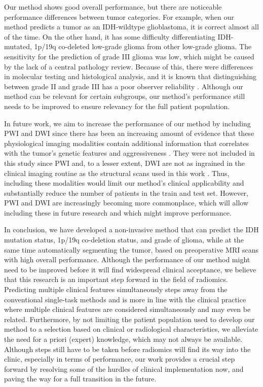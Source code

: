 Our method shows good overall performance, but there are noticeable performance differences between \gls{tumor} categories.
For example, when our method predicts a \gls{tumor} as an \gls{IDH}-wildtype glioblastoma, it is correct almost all of the time.
On the other hand, it has some difficulty differentiating \gls{IDH}-mutated, 1p/19q co-deleted low-grade glioma from other low-grade glioma.
The sensitivity for the prediction of grade III glioma was low, which might be caused by the lack of a central pathology review.
Because of this, there were differences in molecular testing and histological analysis, and it is known that distinguishing between grade II and grade III has a poor observer reliability \autocite{vandenbent2010interobserver}.
Although our method can be relevant for certain subgroups, our method's performance still needs to be improved to ensure relevancy for the full patient population.

In future work, we aim to increase the performance of our method by including \gls{PWI} and \gls{DWI} since there has been an increasing amount of evidence that these physiological imaging modalities contain additional information that correlates with the \gls{tumor}'s genetic features and aggressiveness \autocite{park2020radiomicspwi, kim2020diffusion}.
They were not included in this study since \gls{PWI} and, to a lesser extent, \gls{DWI} are not as ingrained in the clinical imaging routine as the structural scans used in this work \autocite{thust2018gliomaimaging, fresychlag2018imaging}.
Thus, including these modalities would limit our method's clinical applicability and substantially reduce the number of patients in the train and test set.
However, \gls{PWI} and \gls{DWI} are increasingly becoming more commonplace, which will allow including these in future research and which might improve performance.

In conclusion, we have developed a non-invasive method that can predict the \gls{IDH} mutation status, 1p/19q co-deletion status, and grade of glioma, while at the same time automatically segmenting the \gls{tumor}, based on preoperative \gls{MRI} scans with high overall performance.
Although the performance of our method might need to be improved before it will find widespread clinical acceptance, we believe that this research is an important step forward in the field of radiomics.
Predicting multiple clinical features simultaneously steps away from the conventional single-task methods and is more in line with the clinical practice where multiple clinical features are considered simultaneously and may even be related.
Furthermore, by not limiting the patient population used to develop our method to a selection based on clinical or radiological characteristics, we alleviate the need for a priori (expert) knowledge, which may not always be available.
Although steps still have to be taken before radiomics will find its way into the clinic, especially in terms of performance, our work provides a crucial step forward by resolving some of the hurdles of clinical implementation now, and paving the way for a full transition in the future.


